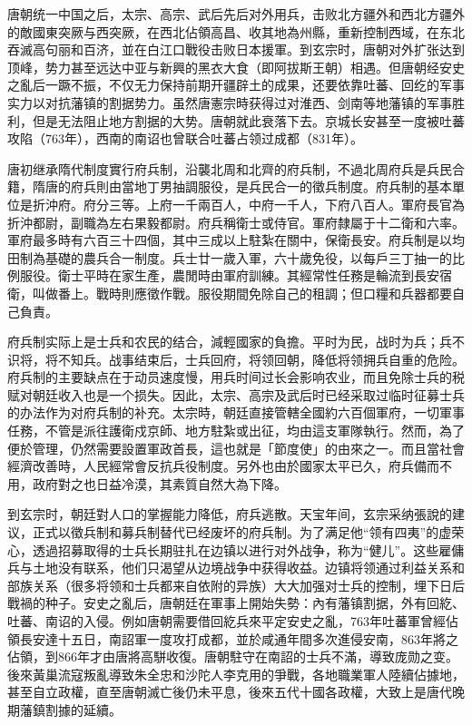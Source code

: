 唐朝统一中国之后，太宗、高宗、武后先后对外用兵，击败北方疆外和西北方疆外的敵國東突厥与西突厥，在西北佔領高昌、收其地為州縣，重新控制西域，在东北吞滅高句丽和百济，並在白江口戰役击败日本援軍。到玄宗时，唐朝对外扩张达到顶峰，势力甚至远达中亚与新興的黑衣大食（即阿拔斯王朝）相遇。但唐朝经安史之亂后一蹶不振，不仅无力保持前期开疆辟土的成果，还要依靠吐蕃、回纥的军事实力以对抗藩镇的割据势力。虽然唐憲宗時获得过对淮西、剑南等地藩镇的军事胜利，但是无法阻止地方割据的大势。唐朝就此衰落下去。京城长安甚至一度被吐蕃攻陷（763年），西南的南诏也曾联合吐蕃占领过成都（831年）。

唐初继承隋代制度實行府兵制，沿襲北周和北齊的府兵制，不過北周府兵是兵民合籍，隋唐的府兵則由當地丁男抽調服役，是兵民合一的徵兵制度。府兵制的基本單位是折沖府。府分三等。上府一千兩百人，中府一千人，下府八百人。軍府長官為折沖都尉，副職為左右果毅都尉。府兵稱衛士或侍官。軍府隸屬于十二衛和六率。軍府最多時有六百三十四個，其中三成以上駐紮在關中，保衛長安。府兵制是以均田制為基礎的農兵合一制度。兵士廿一歲入軍，六十歲免役，以每戶三丁抽一的比例服役。衛士平時在家生產，農閒時由軍府訓練。其經常性任務是輪流到長安宿衛，叫做番上。戰時則應徵作戰。服役期間免除自己的租調；但口糧和兵器都要自己負責。

府兵制实际上是士兵和农民的结合，減輕國家的負擔。平时为民，战时为兵；兵不识将，将不知兵。战事结束后，士兵回府，将领回朝，降低将领拥兵自重的危险。府兵制的主要缺点在于动员速度慢，用兵时间过长会影响农业，而且免除士兵的税赋对朝廷收入也是一个损失。因此，太宗、高宗及武后时已经采取过临时征募士兵的办法作为对府兵制的补充。太宗時，朝廷直接管轄全國約六百個軍府，一切軍事任務，不管是派往護衛戍京師、地方駐紮或出征，均由這支軍隊執行。然而，為了便於管理，仍然需要設置軍政首長，這也就是「節度使」的由來之一。而且當社會經濟改善時，人民經常會反抗兵役制度。另外也由於國家太平已久，府兵備而不用，政府對之也日益冷漠，其素質自然大為下降。

到玄宗时，朝廷對人口的掌握能力降低，府兵逃散。天宝年间，玄宗采纳張說的建议，正式以徵兵制和募兵制替代已经废坏的府兵制。为了满足他“领有四夷”的虚荣心，透過招募取得的士兵长期驻扎在边镇以进行对外战争，称为“健儿”。这些雇傭兵与土地没有联系，他们只渴望从边境战争中获得收益。边镇将领通过利益关系和部族关系（很多将领和士兵都来自依附的异族）大大加强对士兵的控制，埋下日后戰禍的种子。安史之亂后，唐朝廷在軍事上開始失勢：內有藩镇割据，外有回紇、吐蕃、南诏的入侵。例如唐朝需要借回紇兵來平定安史之亂，763年吐蕃軍曾經佔領長安達十五日，南詔軍一度攻打成都，並於咸通年間多次進侵安南，863年將之佔領，到866年才由唐將高駢收復。唐朝駐守在南詔的士兵不滿，導致庞勋之变。後來黃巢流寇叛亂導致朱全忠和沙陀人李克用的爭戰，各地職業軍人陸續佔據地，甚至自立政權，直至唐朝滅亡後仍未平息，後來五代十國各政權，大致上是唐代晚期藩鎮割據的延續。

